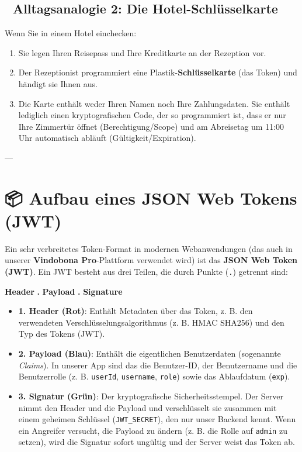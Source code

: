 \documentclass[11pt,a4paper]{article}
\begin{document}
\subsection{🏨 Alltagsanalogie 2: Die Hotel-Schlüsselkarte}
Wenn Sie in einem Hotel einchecken:
\begin{enumerate}
    \item Sie legen Ihren Reisepass und Ihre Kreditkarte an der Rezeption vor.
    \item Der Rezeptionist programmiert eine Plastik-\textbf{Schlüsselkarte} (das Token) und händigt sie Ihnen aus.
    \item Die Karte enthält weder Ihren Namen noch Ihre Zahlungsdaten. Sie enthält lediglich einen kryptografischen Code, der so programmiert ist, dass er nur Ihre Zimmertür öffnet (Berechtigung/Scope) und am Abreisetag um 11:00 Uhr automatisch abläuft (Gültigkeit/Expiration).
\end{enumerate}

---

\section{📦 Aufbau eines JSON Web Tokens (JWT)}
Ein sehr verbreitetes Token-Format in modernen Webanwendungen (das auch in unserer \textbf{Vindobona Pro}-Plattform verwendet wird) ist das \textbf{JSON Web Token (JWT)}. Ein JWT besteht aus drei Teilen, die durch Punkte (\texttt{.}) getrennt sind:

\begin{center}
    \textbf{\textcolor{headerred}{Header}} \textbf{.} \textbf{\textcolor{payloadblue}{Payload}} \textbf{.} \textbf{\textcolor{signgreen}{Signature}}
\end{center}

\begin{tcolorbox}[colback=bglight, colframe=accentblue, title=Aufbau des JWT im Detail]
\begin{itemize}[leftmargin=*]
    \item \textbf{\textcolor{headerred}{1. Header (Rot)}}: Enthält Metadaten über das Token, z. B. den verwendeten Verschlüsselungsalgorithmus (z. B. HMAC SHA256) und den Typ des Tokens (JWT).
    \item \textbf{\textcolor{payloadblue}{2. Payload (Blau)}}: Enthält die eigentlichen Benutzerdaten (sogenannte \textit{Claims}). In unserer App sind das die Benutzer-ID, der Benutzername und die Benutzerrolle (z. B. \texttt{userId}, \texttt{username}, \texttt{role}) sowie das Ablaufdatum (\texttt{exp}).
    \item \textbf{\textcolor{signgreen}{3. Signatur (Grün)}}: Der kryptografische Sicherheitsstempel. Der Server nimmt den Header und die Payload und verschlüsselt sie zusammen mit einem geheimen Schlüssel (\texttt{JWT\_SECRET}), den nur unser Backend kennt. Wenn ein Angreifer versucht, die Payload zu ändern (z. B. die Rolle auf \texttt{admin} zu setzen), wird die Signatur sofort ungültig und der Server weist das Token ab.
\end{itemize}
\end{tcolorbox}
\end{document}
